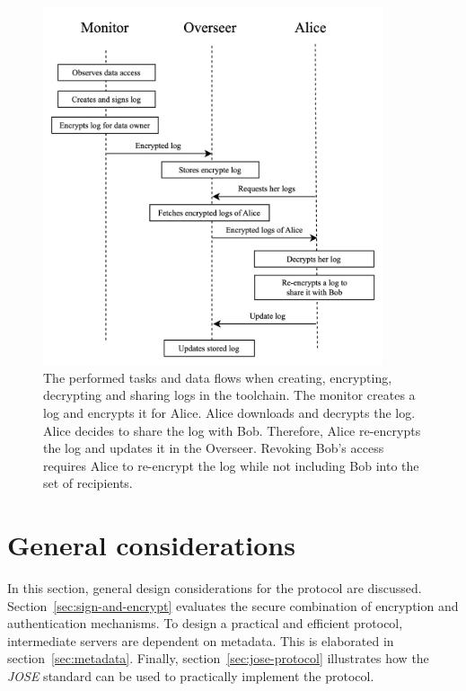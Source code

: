 \documentclass[../main.tex]{subfiles}
\begin{document}
\begin{figure}[h!]
    \includegraphics[width=10cm]{../img/05/overview.jpg}
    \centering
    \caption[Protocol overview]{
        The performed tasks and data flows when creating, encrypting, decrypting and sharing logs in the toolchain.
        The monitor creates a log and encrypts it for Alice.
        Alice downloads and decrypts the log.
        Alice decides to share the log with Bob.
        Therefore, Alice re-encrypts the log and updates it in the Overseer.
        Revoking Bob's access requires Alice to re-encrypt the log while not including Bob into the set of recipients.
    }
    \label{fig:protocol-overview}
\end{figure}

\section{General considerations}
\label{sec:protocol-considerations}
In this section, general design considerations for the protocol are discussed.
Section~\ref{sec:sign-and-encrypt} evaluates the secure combination of encryption and authentication mechanisms.
To design a practical and efficient protocol, intermediate servers are dependent on metadata.
This is elaborated in section~\ref{sec:metadata}.
Finally, section~\ref{sec:jose-protocol} illustrates how the \emph{JOSE} standard can be used to practically implement the protocol.
\end{document}
